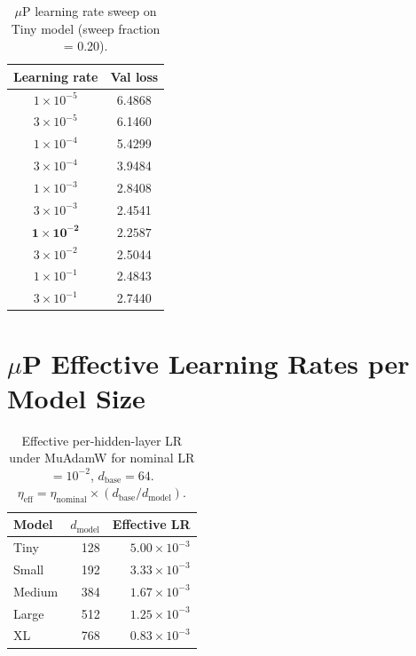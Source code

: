 \documentclass[10pt,letterpaper]{article}
\begin{document}
\begin{table}[H]
\centering
\caption{$\mu$P learning rate sweep on Tiny model (sweep fraction = 0.20).}
\label{tab:mup_lr_sweep}
\begin{tabular}{cc}
\toprule
Learning rate & Val loss \\
\midrule
$1 \times 10^{-5}$ & 6.4868 \\
$3 \times 10^{-5}$ & 6.1460 \\
$1 \times 10^{-4}$ & 5.4299 \\
$3 \times 10^{-4}$ & 3.9484 \\
$1 \times 10^{-3}$ & 2.8408 \\
$3 \times 10^{-3}$ & 2.4541 \\
$\mathbf{1 \times 10^{-2}}$ & $\mathbf{2.2587}$ \\
$3 \times 10^{-2}$ & 2.5044 \\
$1 \times 10^{-1}$ & 2.4843 \\
$3 \times 10^{-1}$ & 2.7440 \\
\bottomrule
\end{tabular}
\end{table}

\section{$\mu$P Effective Learning Rates per Model Size}
\label{app:mup_eff_lr}

\begin{table}[H]
\centering
\caption{Effective per-hidden-layer LR under MuAdamW for nominal LR $= 10^{-2}$,
         $d_\text{base} = 64$.
         $\eta_\text{eff} = \eta_\text{nominal} \times (d_\text{base}/d_\text{model})$.}
\label{tab:mup_eff_lr}
\begin{tabular}{lrr}
\toprule
Model & $d_\text{model}$ & Effective LR \\
\midrule
Tiny   & 128 & $5.00 \times 10^{-3}$ \\
Small  & 192 & $3.33 \times 10^{-3}$ \\
Medium & 384 & $1.67 \times 10^{-3}$ \\
Large  & 512 & $1.25 \times 10^{-3}$ \\
XL     & 768 & $0.83 \times 10^{-3}$ \\
\bottomrule
\end{tabular}
\end{table}

\end{document}
